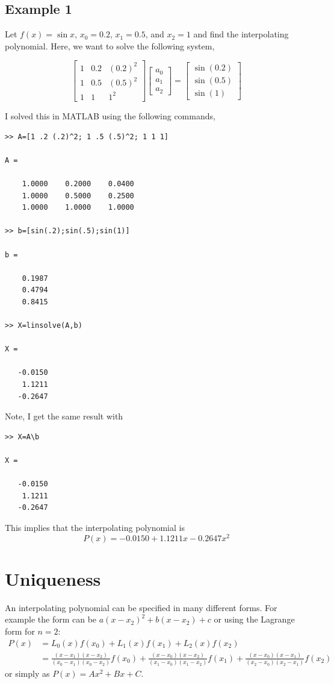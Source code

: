 \documentclass [titlepage,12pt,letter] {article}
\begin{document}
\subsection{Example 1} Let $f(x) = \sin x$, $x_0 = 0.2$, $x_1 = 0.5$, and $x_2 = 1$ and find the interpolating polynomial. Here, we want to solve the following system,

\[
\begin{bmatrix}
    1       & 0.2 &  (0.2)^2 \\
   1       & 0.5 &  (0.5)^2 \\
   1       & 1 & 1^2
\end{bmatrix}
\begin{bmatrix}
    a_0 \\
    a_1  \\
    a_2 
\end{bmatrix}
=
\begin{bmatrix}
   \sin(0.2) \\
  \sin(0.5)  \\
    \sin(1) 
\end{bmatrix}
\]

I solved this in MATLAB using the following commands,

\begin{verbatim}
>> A=[1 .2 (.2)^2; 1 .5 (.5)^2; 1 1 1]

A =

    1.0000    0.2000    0.0400
    1.0000    0.5000    0.2500
    1.0000    1.0000    1.0000

>> b=[sin(.2);sin(.5);sin(1)]

b =

    0.1987
    0.4794
    0.8415

>> X=linsolve(A,b)

X =

   -0.0150
    1.1211
   -0.2647
\end{verbatim}

Note, I get the same result with

\begin{verbatim}
>> X=A\b

X =

   -0.0150
    1.1211
   -0.2647
\end{verbatim}

This implies that the interpolating polynomial is \[P(x)=-0.0150+1.1211x-0.2647x^2\]

\section{Uniqueness} 
An interpolating polynomial can be specified in many different forms. For example the form 
can be $a(x-x_2)^2 + b(x-x_2) + c$ or using the Lagrange form for $n=2$: 
\begin{align*}
P(x) &= L_0(x) f(x_0) + L_1(x) f(x_1) + L_2(x) f(x_2) \\
     &= \frac{(x-x_1)(x-x_2)}{(x_0 - x_1)(x_0-x_2)}f(x_0) + \frac{(x-x_0)(x-x_2)}{(x_1-x_0)(x_1-x_2)} f(x_1) + \frac{(x-x_0)(x-x_1)}{(x_2-x_0)(x_2-x_1)}f(x_2) 
\end{align*} 
\noindent 
or simply as $P(x) = Ax^2 + Bx + C$. 
\end{document}
